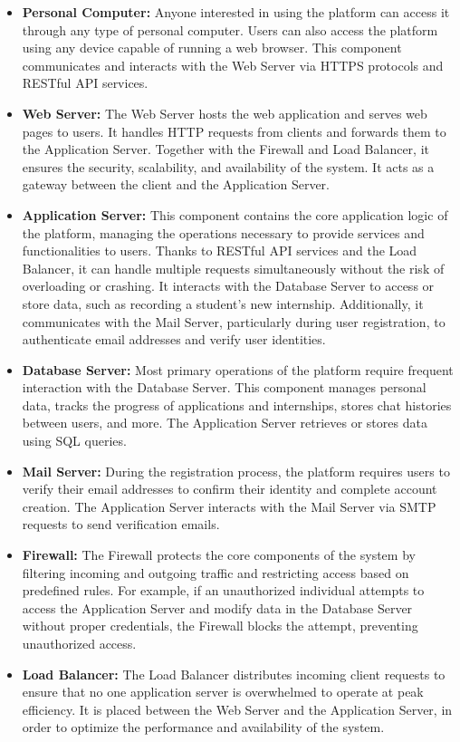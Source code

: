 \begin{itemize}
    \item \textbf{Personal Computer:} Anyone interested in using the platform can access it through any type of personal computer. Users can also access the platform 
    using any device capable of running a web browser. This component communicates and interacts with the Web Server via HTTPS protocols and RESTful API services.
    \item \textbf{Web Server:} The Web Server hosts the web application and serves web pages to users. It handles HTTP requests from clients and forwards them to the 
    Application Server. Together with the Firewall and Load Balancer, it ensures the security, scalability, and availability of the system. It acts as a gateway between
     the client and the Application Server.
    \item \textbf{Application Server:} This component contains the core application logic of the platform, managing the operations necessary to provide services and 
    functionalities to users. Thanks to RESTful API services and the Load Balancer, it can handle multiple requests simultaneously without the risk of overloading or 
    crashing. It interacts with the Database Server to access or store data, such as recording a student's new internship. Additionally, it communicates with the Mail
     Server, particularly during user registration, to authenticate email addresses and verify user identities.
    \item \textbf{Database Server:} Most primary operations of the platform require frequent interaction with the Database Server. This component manages personal data, 
    tracks the progress of applications and internships, stores chat histories between users, and more. The Application Server retrieves or stores data using SQL queries.
    \item \textbf{Mail Server:} During the registration process, the platform requires users to verify their email addresses to confirm their identity and complete 
    account creation. The Application Server interacts with the Mail Server via SMTP requests to send verification emails.
    \item \textbf{Firewall:} The Firewall protects the core components of the system by filtering incoming and outgoing traffic and restricting access based on 
    predefined rules. For example, if an unauthorized individual attempts to access the Application Server and modify data in the Database Server without proper 
    credentials, the Firewall blocks the attempt, preventing unauthorized access.
    \item \textbf{Load Balancer:} The Load Balancer distributes incoming client requests to ensure that no one application server is overwhelmed to operate at peak
        efficiency. It is placed between the Web Server and the Application Server, in order to optimize the performance and availability of the system.
\end{itemize}

